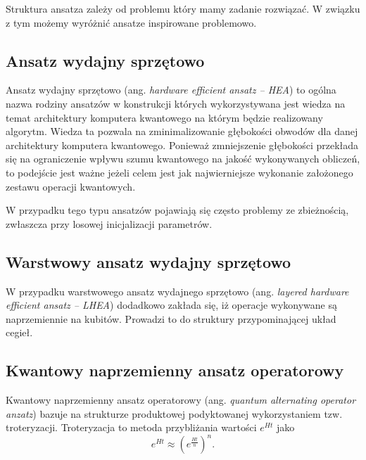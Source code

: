 \documentclass[a4paper,11pt]{article}
\newcommand{\ang}[1]{(ang. \emph{#1})}
\begin{document}
Struktura ansatza zależy od problemu który mamy zadanie rozwiązać. W związku z tym możemy wyróżnić ansatze inspirowane problemowo.



\subsection{Ansatz wydajny sprzętowo}

Ansatz wydajny sprzętowo \ang{hardware efficient ansatz -- HEA} to ogólna nazwa rodziny ansatzów w konstrukcji których wykorzystywana jest wiedza na temat architektury komputera kwantowego na którym będzie realizowany algorytm. Wiedza ta pozwala na zminimalizowanie głębokości obwodów dla danej architektury komputera kwantowego. Ponieważ zmniejszenie głębokości przekłada się na ograniczenie wpływu szumu kwantowego na jakość wykonywanych obliczeń, to podejście jest ważne jeżeli celem jest jak najwierniejsze wykonanie założonego zestawu operacji kwantowych.

W przypadku tego typu ansatzów pojawiają się często problemy ze zbieżnością, zwłaszcza przy losowej inicjalizacji parametrów.

\subsection{Warstwowy ansatz wydajny sprzętowo}

W przypadku warstwowego ansatz wydajnego sprzętowo \ang{layered hardware efficient ansatz -- LHEA} dodadkowo zakłada się, iż operacje wykonywane są naprzemiennie na kubitów. Prowadzi to do struktury przypominającej układ cegieł.  

\subsection{Kwantowy naprzemienny ansatz operatorowy}

Kwantowy naprzemienny ansatz operatorowy \ang{quantum alternating operator anzatz} bazuje na strukturze produktowej podyktowanej wykorzystaniem tzw. troteryzacji. Troteryzacja to metoda przybliżania wartości $e^{Ht}$ jako
\begin{equation}
	e^{Ht} \approx \left(e^{\frac{Ht}{n}}\right)^n.
\end{equation}
\end{document}
